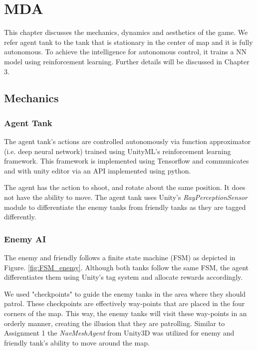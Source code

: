 
\chapter{MDA}

This chapter discusses the mechanics, dynamics and aesthetics of the game. We refer agent tank to the tank that is stationary in the center of map and it is fully autonomous. To achieve the intelligence for autonomous control, it trains a NN model using reinforcement learning. Further details will be discussed in Chapter 3. 
\FloatBarrier

\label{sec:MDA}

\section{Mechanics}

\subsection{Agent Tank}
The agent tank's actions are controlled autonomously via function approximator (i.e. deep neural network) trained using UnityML's reinforcement learning framework. This framework is implemented using Tensorflow\cite{goldsborough2016tour} and communicates and with unity editor via an API implemented using python. 


The agent has the action to shoot, and rotate about the same position. It does not have the ability to move. The agent tank uses Unity's \textit{RayPerceptionSensor} \cite{majumder2021understanding} module to differentiate the enemy tanks from friendly tanks as they are tagged differently.

\subsection{Enemy AI}

The enemy and friendly follows a finite state machine (FSM) as depicted in Figure. \ref{fig:FSM_enemy}. Although both tanks follow the same FSM, the agent differentiates them using Unity's tag system and allocate rewards accordingly.

We used "checkpoints" to guide the enemy tanks in the area where they should patrol. These checkpoints are effectively way-points that are placed in the four corners of the map. This way, the enemy tanks will visit these way-points in an orderly manner, creating the illusion that they are patrolling. Similar to Assignment 1 the \textit{NavMeshAgent} from Unity3D was utilized for enemy and friendly tank’s ability to move around the map. 


